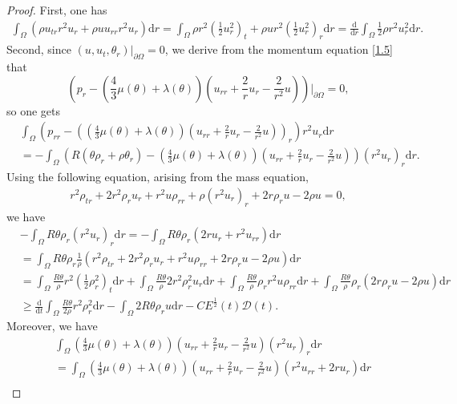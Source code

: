 \documentclass[11pt,reqno]{amsart}
\numberwithin{equation}{section}
\newcommand{\dif}{\mathrm{d}}
\begin{document}
\begin{proof}
 First, one has
 \begin{align*}
 \int_{\Omega} \left( \rho u_{tr} r^2 u_r+\rho u u_{rr} r^2 u_r\right)\dif r =\int_{\Omega} \rho r^2 \left(\frac{1}{2} u_r^2\right)_t +\rho u r^2 \left(\frac{1}{2} u_r^2 \right)_r \dif r
 =\frac{\dif}{\dif r} \int_{\Omega} \frac{1}{2} \rho r^2 u_r^2 \dif r.
 \end{align*}
 Second, since $(u, u_t, \theta_r)|_{\partial \Omega}=0$, we derive from the momentum equation \eqref{1.5} that
 $$
 \left(p_r-(\frac{4}{3} \mu(\theta)+\lambda(\theta))\left(u_{rr}+\frac{2}{r} u_r-\frac{2}{r^2} u\right)\right)\Big|_{\partial\Omega}=0,
 $$
  so one gets
 \begin{align*}
& \int_{\Omega} \left(p_{rr}- \left((\frac{4}{3} \mu(\theta)+\lambda(\theta))\left(u_{rr}+\frac{2}{r} u_r-\frac{2}{r^2} u\right)\right)_r \right)r^2 u_r \dif r\\
&  =-\int_{\Omega}\left( R(\theta \rho_r+\rho \theta_r)- (\frac{4}{3} \mu(\theta)+\lambda(\theta))\left(u_{rr}+\frac{2}{r} u_r-\frac{2}{r^2} u\right)\right) (r^2 u_r)_r \dif r.
 \end{align*}
 Using the following equation, arising from the mass equation,
 \begin{align}
 r^2 \rho_{tr}+2r^2 \rho_r u_r+r^2 u \rho_{rr} +\rho (r^2 u_r)_r+2 r \rho_r u-2\rho u=0,
 \end{align}
 we have
 \begin{align*}
 &-\int_{\Omega} R \theta \rho_r (r^2 u_r)_r \dif r=-\int_{\Omega} R \theta \rho_r( 2r u_r+r^2 u_{rr}) \dif r \\
 &=\int_{\Omega} R\theta \rho_r \frac{1}{\rho} \left( r^2 \rho_{tr}+2r^2 \rho_r u_r+r^2 u \rho_{rr} +2 r \rho_r u- 2\rho u\right) \dif r\\
 &=\int_{\Omega}  \frac{R\theta}{\rho} r^2 \left(\frac{1}{2} \rho_r^2\right)_t\dif r+ \int_{\Omega} \frac{R\theta}{\rho} 2 r^2 \rho_r^2 u_r \dif r+\int_{\Omega} \frac{R\theta}{\rho} \rho_r r^2 u \rho_{rr}\dif r
 +\int_{\Omega} \frac{R\theta}{\rho} \rho_r (2 r \rho_r u-2\rho u) \dif r\\
& \ge \frac{\dif}{\dif t} \int_{\Omega} \frac{R\theta}{2\rho} r^2  \rho_r^2 \dif r-\int_{\Omega} 2 R\theta \rho_r u \dif r-C E^\frac{1}{2}(t) \mathcal D(t).
 \end{align*}
 Moreover, we have
 \begin{align*}
& \int_{\Omega} \left(\frac{4}{3} \mu(\theta)+\lambda(\theta)\right)\left(u_{rr}+\frac{2}{r}u_r-\frac{2}{r^2} u\right) (r^2 u_r)_r \dif r\\
  &=\int_{\Omega} \left(\frac{4}{3} \mu(\theta)+\lambda(\theta)\right)\left(u_{rr}+\frac{2}{r}u_r-\frac{2}{r^2} u\right) (r^2 u_{rr}+2r u_r) \dif r\\

\end{align*}
\end{proof}
\end{document}
